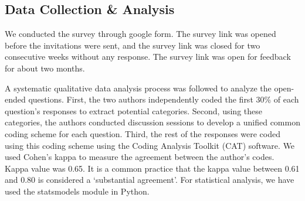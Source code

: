 \subsection{Data Collection \& Analysis}
\label{survey_data_collection}

We conducted the survey through google form. The survey link was opened before the invitations were sent, and the survey link was closed for two consecutive weeks without any response. The survey link was open for feedback for about two months. 

A systematic qualitative data analysis process was followed to analyze the open-ended questions. First, the two authors independently coded the first 30\% of each question's responses to extract potential categories. Second, using these categories, the authors conducted discussion sessions to develop a unified common coding scheme for each question. Third, the rest of the responses were coded using this coding scheme using the Coding Analysis Toolkit (CAT)\cite{Lu2008} software. We used Cohen's kappa\cite{Cohen1960} to measure the agreement between the author's codes. Kappa value was 0.65. It is a common practice that the kappa value between 0.61 and 0.80\cite{Landis1977} is considered a `substantial agreement’. For statistical analysis, we have used the statsmodels\cite{seabold2010} module in Python.
 
